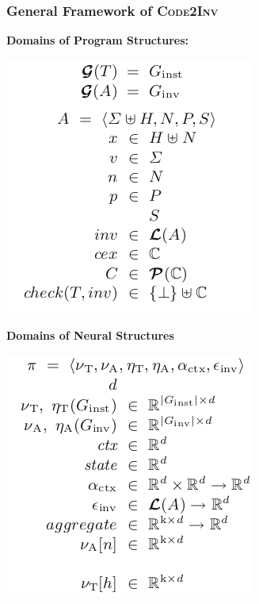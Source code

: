 \documentclass[11pt]{beamer}
\begin{document}
\begin{frame}\frametitle{General Framework of \textsc{Code2Inv}}
\begin{multicols}{2}
\textbf{Domains of Program Structures:}
\begin{center}
\includegraphics[scale=0.4]{programStruct.png}
\end{center}

\textbf{Domains of Neural Structures}
\begin{center}
\includegraphics[scale=0.4]{NeuralPolicy.png}
\end{center}
\end{multicols}
\end{frame}
\end{document}
